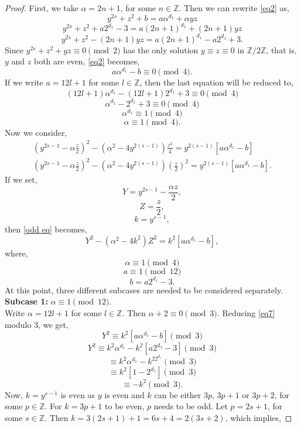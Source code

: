 \documentclass[12pt, reqno]{amsart}
\numberwithin{equation}{section}
\theoremstyle{definition}
\theoremstyle{nodefstyle}
\begin{document}
\begin{proof}
    First, we take $\alpha =2n+1$, for some $n \in \mathbb{Z}$. Then we can rewrite \eqref{eq2} as,
    \[y^{2s}+z^2+b=a\alpha ^{d_1}+\alpha yz\]
    \[ y^{2s}+z^2+a2^{d_1}-3=a(2n+1)^{d_1}+(2n+1)yz\]
    \[  y^{2s}+z^2-(2n+1)yz=a(2n+1)^{d_1}-a2^{d_1}+3.\]
    Since $y^{2s}+z^2+yz \equiv 0 \pmod{2}$ has the only solution $y \equiv z \equiv 0$ in $\mathbb{Z}/{2\mathbb{Z}}$, that is, $y$ and $z$ both are even, \eqref{eq2} becomes,
    \[a\alpha ^{d_1}-b \equiv 0 \pmod{4}.\]
    If we write $a=12l+1$ for some $l \in \mathbb{Z}$, then the last equation will be reduced to,
    \[(12l+1)\alpha ^{d_1}-(12l+1)2^{d_1}+3 \equiv 0 \pmod{4}\]
    \[ \alpha ^{d_1}-2^{d_1}+3 \equiv 0 \pmod{4}\]
    \[  \alpha ^{d_1} \equiv 1\pmod{4}\]
    \[ \alpha \equiv 1 \pmod{4}.\]
    Now we consider,
    \begin{align}
    \left(y^{2s-1}-\alpha \frac{z}{2}\right)^2-\left(\alpha ^2-4y^{2(s-1)}\right)\frac{z^2}{4}=y^{2(s-1)}\left[a\alpha ^{d_1}-b\right]\\
    \left(y^{2s-1}-\alpha \frac{z}{2}\right)^2-\left(\alpha ^2-4y^{2(s-1)}\right)\left(\frac{z}{2}\right)^2=y^{2(s-1)}\left[a\alpha ^{d_1}-b\right].\label{odd eq}
    \end{align}
    If we set,
        \[Y=y^{2s-1}-\frac{\alpha z}{2},\]
        \[Z=\frac{z}{2},\]
        \[k=y^{s-1},\]
        then \eqref{odd eq} becomes,
        \begin{equation}
            Y^2-\left(\alpha ^2-4k^2\right)Z^2=k^2\left[a\alpha ^{d_1}-b\right], \label{eq7}
        \end{equation}
        where,
        \[\alpha \equiv 1 \pmod{4}\]
        \[a \equiv 1 \pmod{12}\]
        \[b=a2^{d_1}-3.\]
        At this point, three different subcases are needed to be considered separately.\\
        \vspace{2mm}
        \textbf{Subcase 1:} $\alpha \equiv 1\pmod{12}.$\\
        \vspace{2mm}
        Write $\alpha =12l+1$ for some $l \in \mathbb{Z}$. Then $\alpha +2\equiv 0 \pmod{3}.$
        Reducing \eqref{eq7} modulo $3$, we get,
        \[Y^2 \equiv k^2\left[a\alpha ^{d_1}-b\right] \pmod{3}\]
        \[ Y^2 \equiv k^2\alpha ^{d_1}-k^2\left [a2^{d_1}-3\right]\pmod{3}\] \hfill
        \[\equiv k^2\alpha ^{d_1}-k^22^{d_1} \pmod{3}\]\hfill
        \[\equiv k^2\left[1-2^{d_1}\right] \pmod{3}\]\hfill
        \[\equiv -k^2 \pmod{3}.\]
        Now, $k=y^{s-1}$ is even as $y$ is even and $k$ can be either $3p$, $3p+1$ or $3p+2$, for some $p \in \mathbb{Z}$. For $k=3p+1$ to be even, $p$ needs to be odd. Let $p=2s+1$, for some $s \in \mathbb{Z}$. Then $k=3(2s+1)+1=6s+4=2(3s+2)$, which implies,

\end{proof}
\end{document}
